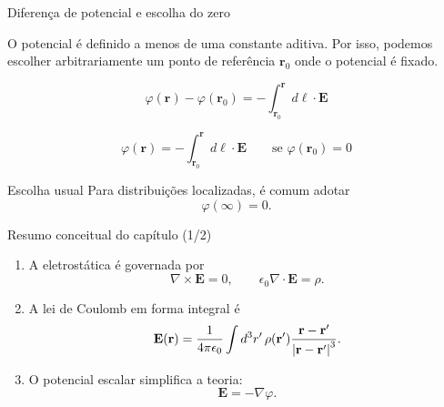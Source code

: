 \documentclass[aspectratio=169,11pt]{beamer}
\newcommand{\E}{\mathbf{E}}
\newcommand{\rr}{\mathbf{r}}
\begin{document}
\begin{frame}{Diferença de potencial e escolha do zero}
\begin{mybox}
\justifying
O potencial é definido a menos de uma constante aditiva. 
Por isso, podemos escolher arbitrariamente um ponto de referência \(\rr_0\) onde o potencial é fixado.
\end{mybox}


\begin{eqbox}
\begin{equation}
\varphi(\rr)-\varphi(\rr_0)
=
-\int_{\rr_0}^{\rr} d\ell\cdot \E
\label{eq:3.17}
\end{equation}
\end{eqbox}

\vspace{0.05cm}

\begin{eqbox}
\begin{equation}
\varphi(\rr)=
-\int_{\rr_0}^{\rr} d\ell\cdot \E
\qquad \text{se } \varphi(\rr_0)=0
\label{eq:3.18}
\end{equation}
\end{eqbox}

\vspace{0.05cm}

\begin{block}{Escolha usual}
Para distribuições localizadas, é comum adotar
\[
\varphi(\infty)=0.
\]
\end{block}
\end{frame}

\begin{frame}{Resumo conceitual do capítulo (1/2)}
\begin{mybox}
\begin{enumerate}
    \item A eletrostática é governada por
    \[
    \nabla\times \E=0,
    \qquad
    \epsilon_0\nabla\cdot\E=\rho.
    \]

    \item A lei de Coulomb em forma integral é
    \[
    \E(\rr)=\frac{1}{4\pi\epsilon_0}\int d^3r'\,\rho(\rr')\frac{\rr-\rr'}{\abs{\rr-\rr'}^3}.
    \]

    \item O potencial escalar simplifica a teoria:
    \[
    \E=-\nabla\varphi.
    \]
\end{enumerate}
\end{mybox}
\end{frame}
\end{document}
